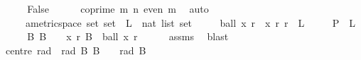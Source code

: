 \begin{isabellebody}
\ \ \isamarkupfalse%
\ \isamarkupfalse%
\ False\isanewline
\ \ \ \ \isamarkupfalse%
\ {\isacartoucheopen}coprime\ m\ n{\isacartoucheclose}\ {\isacartoucheopen}even\ m{\isacartoucheclose}\ \isamarkupfalse%
\ auto\isanewline
{}\isamarkupfalse%
%
\endisatagproof
{\isafoldproof}%
%
\isadelimproof
%
\endisadelimproof
%
\isadelimdocument
%
\endisadelimdocument
%
\isatagdocument
%
\isamarkuptrue%
%
\endisatagdocument
{\isafolddocument}%
%
\isadelimdocument
%
\endisadelimdocument
{}\isamarkupfalse%
\ \isanewline
\ \ \ {\isasymB}\ {\isacharcolon}{\kern0pt}{\isacharcolon}{\kern0pt}\ {\isachardoublequoteopen}{\isacharprime}{\kern0pt}a{\isacharcolon}{\kern0pt}{\isacharcolon}{\kern0pt}metric{\isacharunderscore}{\kern0pt}space\ set\ set{\isachardoublequoteclose}\ \ L\ {\isacharcolon}{\kern0pt}{\isacharcolon}{\kern0pt}\ {\isachardoublequoteopen}nat\ list\ set{\isachardoublequoteclose}\isanewline
\ \ \ {\isachardoublequoteopen}{\isasymS}\ {\isasymsubseteq}\ {\isacharbraceleft}{\kern0pt}ball\ x\ r\ {\isacharbar}{\kern0pt}\ x\ r{\isachardot}{\kern0pt}\ r{\isachargreater}{\kern0pt}{}{\isacharbraceright}{\kern0pt}{\isachardoublequoteclose}\ \ {\isachardoublequoteopen}L\ {\isasymnoteq}\ {\isacharbraceleft}{\kern0pt}{\isacharbraceright}{\kern0pt}{\isachardoublequoteclose}\isanewline
\ \ \ {\isachardoublequoteopen}P\ {\isasymS}\ L{\isachardoublequoteclose}\isanewline
%
\isadelimproof
%
\endisadelimproof
%
\isatagproof
{}\isamarkupfalse%
\ {\isacharminus}{\kern0pt}\isanewline
\ \ \isamarkupfalse%
\ {\isachardoublequoteopen}{\isasymAnd}B{\isachardot}{\kern0pt}\ B\ {\isasymin}\ {\isasymS}\ {\isasymLongrightarrow}\ {\isasymexists}x{\isachardot}{\kern0pt}\ {\isasymexists}r{\isachargreater}{\kern0pt}{}{\isachardot}{\kern0pt}\ B\ {\isacharequal}{\kern0pt}\ ball\ x\ r{\isachardoublequoteclose}\isanewline
\ \ \ \ \isamarkupfalse%
\ assms\ \isamarkupfalse%
\ blast\isanewline
\ \ \isamarkupfalse%
\ \isamarkupfalse%
\ centre\ rad\ \ rad{\isacharcolon}{\kern0pt}\ {\isachardoublequoteopen}{\isasymAnd}B{\isachardot}{\kern0pt}\ B\ {\isasymin}\ {\isasymS}\ {\isasymLongrightarrow}\ rad\ B\ {\isachargreater}{\kern0pt}\ {}{\isachardoublequoteclose}\ \isanewline

\end{isabellebody}
